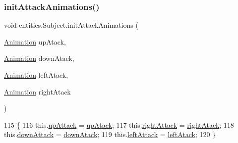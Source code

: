 \subsubsection{\texorpdfstring{init\+Attack\+Animations()}{initAttackAnimations()}\hspace{0.1cm}{\footnotesize\ttfamily [1/2]}}
{\footnotesize\ttfamily void entities.\+Subject.\+init\+Attack\+Animations (\begin{DoxyParamCaption}\item[{\mbox{\hyperlink{classorg_1_1newdawn_1_1slick_1_1_animation}{Animation}}}]{up\+Atack,  }\item[{\mbox{\hyperlink{classorg_1_1newdawn_1_1slick_1_1_animation}{Animation}}}]{down\+Atack,  }\item[{\mbox{\hyperlink{classorg_1_1newdawn_1_1slick_1_1_animation}{Animation}}}]{left\+Atack,  }\item[{\mbox{\hyperlink{classorg_1_1newdawn_1_1slick_1_1_animation}{Animation}}}]{right\+Atack }\end{DoxyParamCaption})\hspace{0.3cm}{\ttfamily [inline]}}


\begin{DoxyCode}
115                                                                                                            
                   \{
116         this.\mbox{\hyperlink{classentities_1_1_subject_ab5b8390d2291803a2174b7ae146f86ac}{upAttack}} = \mbox{\hyperlink{classentities_1_1_subject_ad1b2972826fd7c76750994c8b4d2b87b}{upAtack}};
117         this.\mbox{\hyperlink{classentities_1_1_subject_aab2192306daae64078eba6d19699bcf0}{rightAttack}} = \mbox{\hyperlink{classentities_1_1_subject_a6dcac47e937685e8021165e08289784a}{rightAtack}};
118         this.\mbox{\hyperlink{classentities_1_1_subject_a5b0e607cea5f2a64d7e7f53035995b7b}{downAttack}} = \mbox{\hyperlink{classentities_1_1_subject_ad6e17bb9c3f58a5052f553ef5a64f931}{downAtack}};
119         this.\mbox{\hyperlink{classentities_1_1_subject_ab40f0af736007eb0a7ba1ee89765225a}{leftAttack}} = \mbox{\hyperlink{classentities_1_1_subject_a05131d10bde51bdd1f839559d321223f}{leftAtack}};
120     \}
\end{DoxyCode}
\mbox{\label{classentities_1_1_subject_a46526f264312fcfe7502ee71ee2cdfa5}} 
